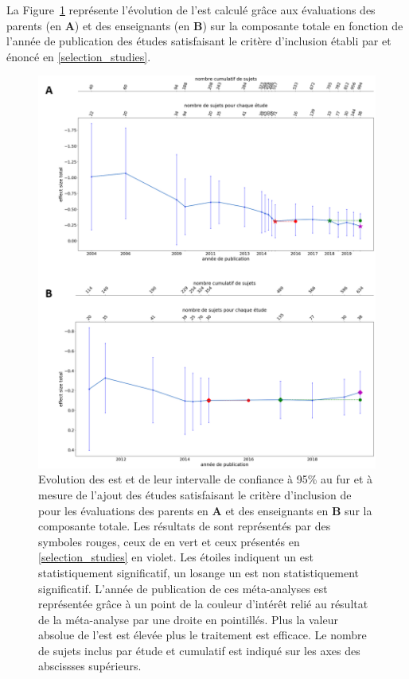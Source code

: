 \begin{itemize}
La Figure~\ref{Figure:meta_analysis_evolution_est_total} représente l'évolution de l'\gls{est} calculé grâce aux évaluations des parents (en \textbf{A}) et des 
enseignants (en \textbf{B}) sur la composante totale en fonction de l'année de publication des études satisfaisant le critère d'inclusion établi par \citep{Cortese2016} et énoncé en 
\ref{selection_studies}.

\begin{figure}[h!]
  \centering
	\includegraphics[width=1\linewidth]{figures/chapter-2/meta-analysis-evolution-summary-effect-total} 
  \caption{Evolution des \gls{est} et de leur intervalle de confiance à 95\% au fur et à mesure de l'ajout des études satisfaisant le critère d'inclusion de \citet{Cortese2016} pour les évaluations des 
	parents en \textbf{A} et des enseignants en \textbf{B} sur la composante totale.
  Les résultats de \citep{Cortese2016} sont représentés par des symboles rouges, ceux de \citet{Bussalb2016clinical} en vert et ceux présentés en \ref{selection_studies} en violet. Les étoiles 
	indiquent un \gls{est} statistiquement significatif, un losange un \gls{est} non statistiquement significatif. L'année de publication de ces méta-analyses est représentée grâce à un point de la couleur 
	d'intérêt relié au résultat de la méta-analyse par une droite en pointillés.
	Plus la valeur absolue de l'\gls{est} est élevée plus le traitement est efficace.
	Le nombre de sujets inclus par étude et cumulatif est indiqué sur les axes des abscissses supérieurs.}
  \label{Figure:meta_analysis_evolution_est_total}
\end{figure}


\end{itemize}

